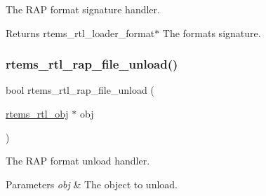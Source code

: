 The R\+AP format signature handler.

\begin{DoxyReturn}{Returns}
rtems\+\_\+rtl\+\_\+loader\+\_\+format$\ast$ The format\textquotesingle{}s signature. 
\end{DoxyReturn}
\mbox{\label{rtl-rap_8c_ab14c07dd22f90a014ff7e192015cf1c4}} 
\subsubsection{\texorpdfstring{rtems\_rtl\_rap\_file\_unload()}{rtems\_rtl\_rap\_file\_unload()}}
{\footnotesize\ttfamily bool rtems\+\_\+rtl\+\_\+rap\+\_\+file\+\_\+unload (\begin{DoxyParamCaption}\item[{\mbox{\hyperlink{structrtems__rtl__obj}{rtems\+\_\+rtl\+\_\+obj}} $\ast$}]{obj }\end{DoxyParamCaption})}

The R\+AP format unload handler.


\begin{DoxyParams}{Parameters}
{\em obj} & The object to unload. \\
\hline
\end{DoxyParams}
